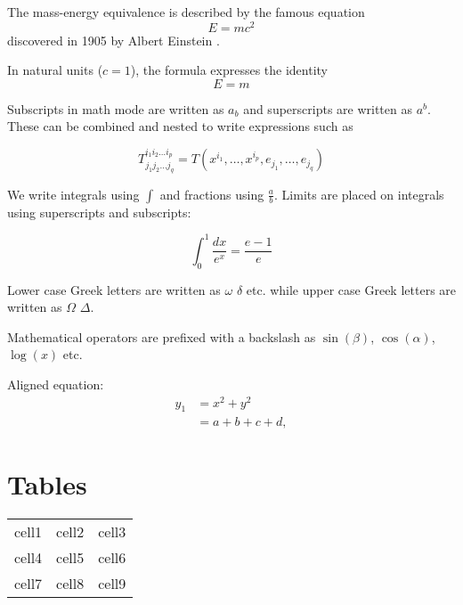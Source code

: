 \documentclass[12pt, a4paper]{article} %
\begin{document}
        The mass-energy equivalence is described by the famous equation
        \[ E=mc^2 \] discovered in 1905 by Albert Einstein \cite{Einstein1905AnP}.

        In natural units ($c = 1$), the formula expresses the identity
        \begin{equation}
            E=m
        \end{equation}

        Subscripts in math mode are written as $a_b$ and superscripts are written as $a^b$. These can be combined and nested to write expressions such as

        \[ T^{i_1 i_2 \dots i_p}_{j_1 j_2 \dots j_q} = T(x^{i_1},\dots,x^{i_p},e_{j_1},\dots,e_{j_q}) \]

        We write integrals using $\int$ and fractions using $\frac{a}{b}$. Limits are placed on integrals using superscripts and subscripts:

        \[ \int_0^1 \frac{dx}{e^x} =  \frac{e-1}{e} \]

        Lower case Greek letters are written as $\omega$ $\delta$ etc. while upper case Greek letters are written as $\Omega$ $\Delta$.

        Mathematical operators are prefixed with a backslash as $\sin(\beta)$, $\cos(\alpha)$, $\log(x)$ etc.

        Aligned equation:
        \begin{equation}
            \begin{aligned}
            \label{eq:alignedexample}
                y_1 &= x^2+y^2\\
                    &= a+b+c+d,
            \end{aligned}
        \end{equation}

    \section{Tables}
        \begin{center}
            \begin{tabular}{c c c}       %
                cell1 & cell2 & cell3 \\ %
                cell4 & cell5 & cell6 \\
                cell7 & cell8 & cell9
            \end{tabular}
        \end{center}
\end{document}
